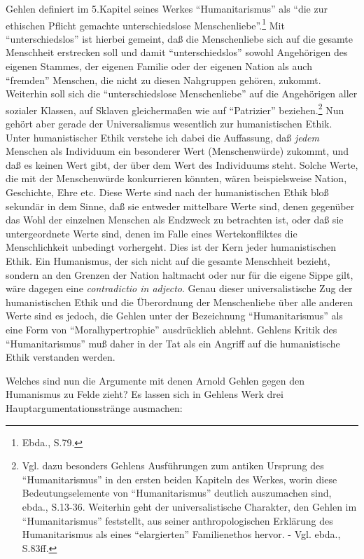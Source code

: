 \documentclass[12pt,a4paper]{article}
\begin{document}
Gehlen definiert im 5.Kapitel seines Werkes "`Humanitarismus"' als "`die zur
ethischen Pflicht gemachte unterschiedslose Menschenliebe"'.\footnote{Ebda.,
S.79.} Mit "`unterschiedslos"' ist hierbei gemeint, daß die Menschenliebe
sich auf die gesamte Menschheit erstrecken soll und damit "`unterschiedslos"'
sowohl Angehörigen des eigenen Stammes, der eigenen Familie oder der eigenen
Nation als auch "`fremden"' Menschen, die nicht zu diesen Nahgruppen gehören,
zukommt. Weiterhin soll sich die "`unterschiedslose Menschenliebe"' auf die
Angehörigen aller sozialer Klassen, auf Sklaven gleichermaßen wie auf
"`Patrizier"' beziehen.\footnote{Vgl. dazu besonders Gehlens Ausführungen zum
antiken Ursprung des "`Humanitarismus"' in den ersten beiden Kapiteln des
Werkes, worin diese Bedeutungselemente von "`Humanitarismus"' deutlich
auszumachen sind, ebda., S.13-36. Weiterhin geht der universalistische
Charakter, den Gehlen im "`Humanitarismus"' feststellt, aus seiner
anthropologischen Erklärung des Humanitarismus als eines "`elargierten"'
Familienethos hervor. - Vgl. ebda., S.83ff.} Nun gehört aber gerade der
Universalismus wesentlich zur humanistischen Ethik. Unter humanistischer
Ethik verstehe ich dabei die Auffassung, daß {\em jedem} Menschen als
Individuum ein besonderer Wert (Menschenwürde) zukommt, und daß es keinen
Wert gibt, der über dem Wert des Individuums steht. Solche Werte, die mit der
Menschenwürde konkurrieren könnten, wären beispielsweise Nation, Geschichte,
Ehre etc. Diese Werte sind nach der humanistischen Ethik bloß sekundär in dem
Sinne, daß sie entweder mittelbare Werte sind, denen gegenüber das Wohl der
einzelnen Menschen als Endzweck zu betrachten ist, oder daß sie
untergeordnete Werte sind, denen im Falle eines Wertekonfliktes die
Menschlichkeit unbedingt vorhergeht. Dies ist der Kern jeder humanistischen
Ethik. Ein Humanismus, der sich nicht auf die gesamte Menschheit bezieht,
sondern an den Grenzen der Nation haltmacht oder nur für die eigene Sippe
gilt, wäre dagegen eine {\em contradictio in adjecto}. Genau dieser
universalistische Zug der humanistischen Ethik und die Überordnung der
Menschenliebe über alle anderen Werte sind es jedoch, die Gehlen unter der
Bezeichnung "`Humanitarismus"' als eine Form von "`Moralhypertrophie"'
ausdrücklich ablehnt. Gehlens Kritik des "`Humanitarismus"' muß daher in der
Tat als ein Angriff auf die humanistische Ethik verstanden werden.

Welches sind nun die Argumente mit denen Arnold Gehlen gegen den Humanismus
zu Felde zieht? Es lassen sich in Gehlens Werk drei
Hauptargumentationsstränge ausmachen:
\end{document}
